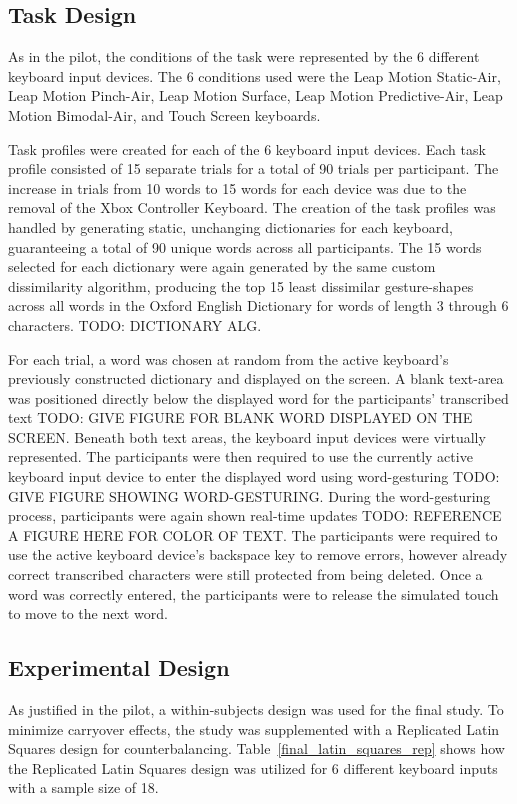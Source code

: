 \subsection{Task Design} \label{final_task_design}
As in the pilot, the conditions of the task were represented by the 6 different keyboard input devices. The 6 conditions used were the Leap Motion Static-Air, Leap Motion Pinch-Air, Leap Motion Surface, Leap Motion Predictive-Air, Leap Motion Bimodal-Air, and Touch Screen keyboards.

Task profiles were created for each of the 6 keyboard input devices. Each task profile consisted of 15 separate trials for a total of 90 trials per participant. The increase in trials from 10 words to 15 words for each device was due to the removal of the Xbox Controller Keyboard. The creation of the task profiles was handled by generating static, unchanging dictionaries for each keyboard, guaranteeing a total of 90 unique words across all participants. The 15 words selected for each dictionary were again generated by the same custom dissimilarity algorithm, producing the top 15 least dissimilar gesture-shapes across all words in the Oxford English Dictionary for words of length 3 through 6 characters. TODO: DICTIONARY ALG.

For each trial, a word was chosen at random from the active keyboard's previously constructed dictionary and displayed on the screen. A blank text-area was positioned directly below the displayed word for the participants' transcribed text TODO: GIVE FIGURE FOR BLANK WORD DISPLAYED ON THE SCREEN. Beneath both text areas, the keyboard input devices were virtually represented. The participants were then required to use the currently active keyboard input device to enter the displayed word using word-gesturing TODO: GIVE FIGURE SHOWING WORD-GESTURING. During the word-gesturing process, participants were again shown real-time updates TODO: REFERENCE A FIGURE HERE FOR COLOR OF TEXT. The participants were required to use the active keyboard device's backspace key to remove errors, however already correct transcribed characters were still protected from being deleted. Once a word was correctly entered, the participants were to release the simulated touch to move to the next word.

\subsection{Experimental Design} \label{final_experimental_design}
As justified in the pilot, a within-subjects design was used for the final study. To minimize carryover effects, the study was supplemented with a Replicated Latin Squares design for counterbalancing. Table~\ref{final_latin_squares_rep} shows how the Replicated Latin Squares design was utilized for 6 different keyboard inputs with a sample size of 18.

